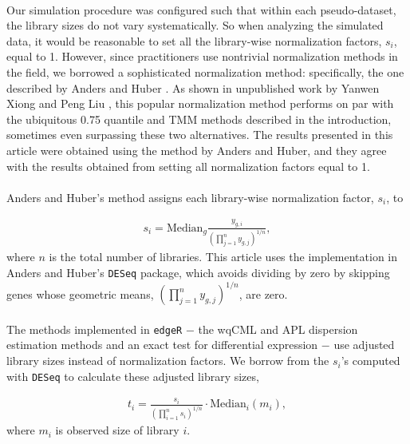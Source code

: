 \documentclass[10pt]{article}
\begin{document}
\paragraph{} \indent Our simulation procedure was configured such that within each pseudo-dataset, the library sizes do not vary systematically. So when analyzing the simulated data, it would be reasonable to set all the library-wise normalization factors, $s_i$, equal to 1. However, since practitioners use nontrivial normalization methods in the field, we borrowed a sophisticated normalization method: specifically, the one described by Anders and Huber \cite{deseq}. As shown in unpublished work by Yanwen Xiong and Peng Liu \cite{xiong}, this popular normalization method performs on par with the ubiquitous 0.75 quantile and TMM methods described in the introduction, sometimes even surpassing these two alternatives. The results presented in this article were obtained using the method by Anders and Huber, and they agree with the results obtained from setting all normalization factors equal to 1. 

\paragraph{} \indent Anders and Huber's method assigns each library-wise normalization factor, $s_i$, to


\begin{align*}
s_i = \text{Median}_g \frac{y_{g, i}}{ \left (\prod_{j = 1}^n y_{g, j} \right)^{1/n}},
\end{align*}
where $n$ is the total number of libraries. This article uses the implementation in Anders and Huber's {\tt DESeq} package, which avoids dividing by zero by skipping genes whose geometric means, $\left (\prod_{j = 1}^n y_{g, j} \right)^{1/n}$, are zero.

\paragraph{} \indent The methods implemented in {\tt edgeR} $-$ the wqCML and APL dispersion estimation methods and an exact test for differential expression $-$ use adjusted library sizes instead of normalization factors. We borrow from the $s_i$'s computed with {\tt DESeq} to calculate these adjusted library sizes,

\begin{align*}
t_i = \frac{s_i}{ \left (\prod_{i = 1}^n s_i \right)^{1/n}} \cdot \text{Median}_i (m_i),
\end{align*} where $m_i$ is observed size of library $i$. 
\end{document}
